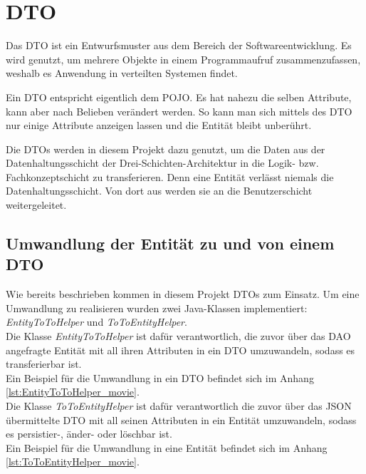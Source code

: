 \section{\acf{DTO}}
\label{sec:dto}
Das \ac{DTO} ist ein Entwurfsmuster aus dem Bereich der Softwareentwicklung.
Es wird genutzt, um mehrere Objekte in einem Programmaufruf zusammenzufassen, weshalb es Anwendung in verteilten Systemen findet.

Ein \ac{DTO} entspricht eigentlich dem \ac{POJO}.
Es hat nahezu die selben Attribute, kann aber nach Belieben verändert werden.
So kann man sich mittels des \ac{DTO} nur einige Attribute anzeigen lassen und die Entität bleibt unberührt.

Die \acsp{DTO} werden in diesem Projekt dazu genutzt, um die Daten aus der Datenhaltungsschicht der Drei-Schichten-Architektur in die Logik- bzw. Fachkonzeptschicht zu transferieren. Denn eine Entität verlässt niemals die Datenhaltungsschicht.
Von dort aus werden sie an die Benutzerschicht weitergeleitet.

\subsection{Umwandlung der Entität zu und von einem \acf{DTO}}
\label{ssec:umwandlung_dto}
Wie bereits beschrieben kommen in diesem Projekt \acp{DTO} zum Einsatz. Um eine Umwandlung zu realisieren wurden zwei Java-Klassen implementiert: \textit{EntityToToHelper} und \textit{ToToEntityHelper}. \\

Die Klasse \textit{EntityToToHelper} ist dafür verantwortlich, die zuvor über das \acs{DAO} angefragte Entität mit all ihren Attributen in ein \acs{DTO} umzuwandeln, sodass es transferierbar ist. \\
Ein Beispiel für die Umwandlung in ein \acs{DTO} befindet sich im Anhang \vref{lst:EntityToToHelper_movie}. \\
Die Klasse \textit{ToToEntityHelper} ist dafür verantwortlich die zuvor über das \acs{JSON} übermittelte \acs{DTO} mit all seinen Attributen in ein Entität umzuwandeln, sodass es persistier-, änder- oder löschbar ist.\\ 
Ein Beispiel für die Umwandlung in eine Entität befindet sich im Anhang \vref{lst:ToToEntityHelper_movie}.

